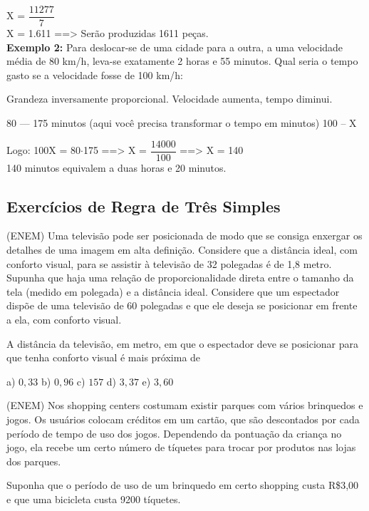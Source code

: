 \begin{multicols*}{2}
	X = $\dfrac{11277}{7}$\\

	X = 1.611  ==> Serão produzidas 1611 peças.\\

	\textbf{Exemplo 2:} Para deslocar-se de uma cidade para a outra, a uma velocidade média de 80 km/h, leva-se exatamente 2 horas e 55 minutos. Qual seria o tempo gasto se a velocidade fosse de 100 km/h:

	Grandeza inversamente proporcional. Velocidade aumenta, tempo diminui.

	80  ---  175 minutos (aqui você precisa transformar o tempo em minutos)
	100 --    X

	Logo:   100X = 80$\cdot$175    ==>  X = $\dfrac{14000}{100}$    ==>   X = 140\\

	140 minutos equivalem a duas horas e 20 minutos.

	\subsection*{Exercícios de Regra de Três Simples}

	\setcounter{numexercicio}{0}
	\execnum (ENEM) Uma televisão pode ser posicionada de modo que se consiga enxergar os detalhes de uma imagem em alta definição. Considere que a distância ideal, com conforto visual, para se assistir à televisão de 32 polegadas
	é de 1,8 metro. Supunha que haja uma relação de proporcionalidade direta entre o tamanho da tela (medido
	em polegada) e a distância ideal. Considere que um espectador dispõe de uma televisão de 60 polegadas e que
	ele deseja se posicionar em frente a ela, com conforto visual.

	A distância da televisão, em metro, em que o espectador deve se posicionar para que tenha conforto visual é mais
	próxima de

	a) $0,33 $ b) $0,96 $ c) $157 $ d) $3,37 $ e) $3,60 $

	\execnum (ENEM) Nos shopping centers costumam existir parques com vários brinquedos e jogos. Os usuários
	colocam créditos em um cartão, que são descontados por cada período de tempo de uso dos jogos. Dependendo da
	pontuação da criança no jogo, ela recebe um certo número de tíquetes para trocar por produtos nas lojas dos parques.

	Suponha que o período de uso de um brinquedo em certo shopping custa R\$3,00 e que uma bicicleta custa 9200 tíquetes.


\end{multicols*}
